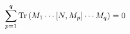 \begin{equation}\label{skiba}
  \sum_{p=1}^q {\rm Tr}\left(M_1 \cdots [N,M_p] \cdots M_q  \right) = 0
\end{equation}


